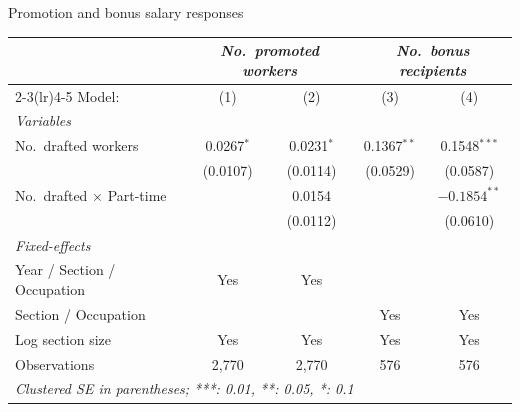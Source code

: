 \begin{frame}{Promotion and bonus salary responses}
    \scriptsize
    \begin{table}
    \centering
    \begin{tabular}{lcccc}
        \tabularnewline \midrule \midrule
        & \multicolumn{2}{c}{\textit{No.\ promoted workers}}
        & \multicolumn{2}{c}{\textit{No.\ bonus recipients}} \\
        \cmidrule(lr){2-3}\cmidrule(lr){4-5}
        Model:                           & (1)            & (2)            & (3)            & (4)            \\
        \midrule
        \emph{Variables}\\
        No.\ drafted workers             & 0.0267$^{*}$   & 0.0231$^{*}$   & 0.1367$^{**}$  & 0.1548$^{***}$ \\
                                         & (0.0107)       & (0.0114)       & (0.0529)       & (0.0587)       \\
        No.\ drafted $\times$ Part-time  &                & 0.0154         &                & $-0.1854^{**}$ \\
                                         &                & (0.0112)       &                & (0.0610)       \\
        \midrule
        \emph{Fixed-effects}\\
        Year / Section / Occupation      & Yes            & Yes            &                &                \\
        Section / Occupation             &                &                & Yes            & Yes            \\
        Log section size                 & Yes            & Yes            & Yes            & Yes            \\
        \midrule
        Observations                     & 2,770          & 2,770          & 576            & 576            \\
        \midrule \midrule
        \multicolumn{5}{l}{\emph{Clustered SE in parentheses; ***: 0.01, **: 0.05, *: 0.1}}\\
    \end{tabular}
    \end{table}
\end{frame}
